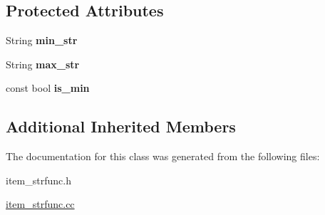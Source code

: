 \subsection*{Protected Attributes}
\begin{DoxyCompactItemize}
\item 
\mbox{\label{classItem__func__like__range_af32a832e81364298fda1581b926b9258}} 
String {\bfseries min\+\_\+str}
\item 
\mbox{\label{classItem__func__like__range_a157e3a54aa66d44902eed0cdb1debc1d}} 
String {\bfseries max\+\_\+str}
\item 
\mbox{\label{classItem__func__like__range_a477c7fd5e5e3f1fa486fcf750cd52329}} 
const bool {\bfseries is\+\_\+min}
\end{DoxyCompactItemize}
\subsection*{Additional Inherited Members}


The documentation for this class was generated from the following files\+:\begin{DoxyCompactItemize}
\item 
item\+\_\+strfunc.\+h\item 
\mbox{\hyperlink{item__strfunc_8cc}{item\+\_\+strfunc.\+cc}}\end{DoxyCompactItemize}
